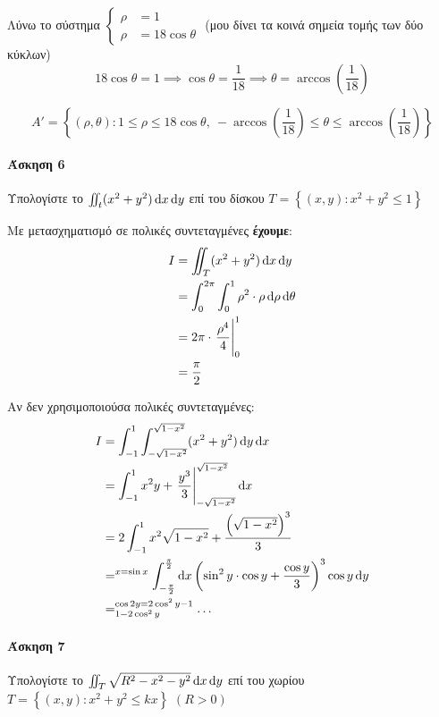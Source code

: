 \documentclass[11pt,a4paper,titlepage]{article}
\begin{document}
\begin{enumparen}
Λύνω το σύστημα \(
\begin{cases}
\rho &=1 \\
\rho &= 18\cos\theta
\end{cases}
\) (μου δίνει τα κοινά σημεία τομής των δύο κύκλων)
\[
18\cos\theta=1\implies\cos\theta=\frac{1}{18}
\implies \theta = \arccos\left( \frac{1}{18}\right)
\]

\[
A' =  \left\lbrace
(\rho,\theta): 1 \leq \rho \leq 18\cos\theta,\
-\arccos\left( \frac{1}{18}\right) \leq \theta \leq \arccos\left( \frac{1}{18}\right)
 \right\rbrace
\]
\end{enumparen}

\paragraph{Άσκηση 6}
Υπολογίστε το \(\iint_t (x^2+y^2)\dif x \dif y\) επί του δίσκου \(T =  \left\lbrace (x,y): x^2+y^2 \leq 1  \right\rbrace\)

Με μετασχηματισμό σε πολικές συντεταγμένες \textbf{έχουμε}:
\begin{align*}
I &= \iint_T (x^2+y^2)\dif x \dif y \\ &=
\int_0^{2\pi} \int_0^1 \rho^2 \cdot \rho\dif\rho\dif\theta \\
&=
2\pi \cdot \left. \frac{\rho^4}{4} \right|_0^1 \\
&= \frac{\pi}{2}
\end{align*}

Αν δεν χρησιμοποιούσα πολικές συντεταγμένες:
\begin{align*}
I&=\int_{-1}^1 \int_{-\sqrt{1-x^2}}^{\sqrt{1-x^2}} (x^2+y^2) \dif y \dif x
\\ &=
\int_{-1}^1x^2y+\left. \frac{y^3}{3} \right|_{-\sqrt{1-x^2}}^{\sqrt{1-x^2}} \dif x
\\ &=
2 \int_{-1}^1 x^2\sqrt{1-x^2} + \frac{\left(\sqrt{1-x^2}\right)^3}{3}
\\ &=^{x=\sin x}
\int_{-\frac{\pi}{2}}^\frac{\pi}{2} \dif x
\left(
\sin^2 y \cdot \cos y + \frac{\cos y}{3}
\right)^3 \cos y \dif y
\\ &=^{\cos 2y = 2 \cos^2 y -1}_{1-2 \cos^2 y}  \dots
\end{align*}


\paragraph{Άσκηση 7}
Υπολογίστε το \(\iint_T \sqrt{R^2-x^2-y^2}\dif x \dif y\) επί του χωρίου
\(T =  \left\lbrace (x,y): x^2+y^2\leq kx \right\rbrace\) \( (R > 0 )\)
\end{document}
